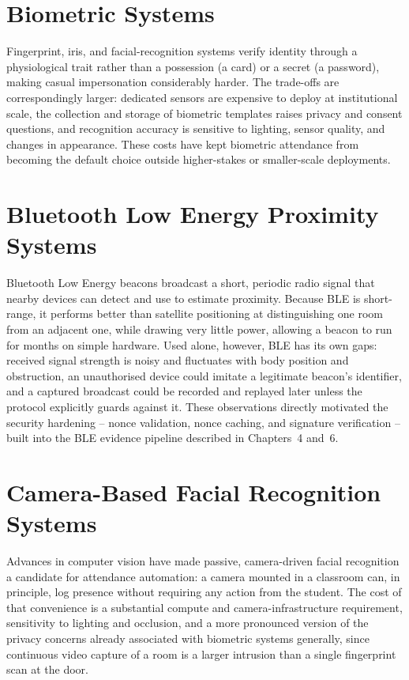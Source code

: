 \documentclass[12pt, a4paper, oneside]{report}
\begin{document}
\section{Biometric Systems}

Fingerprint, iris, and facial-recognition systems verify identity through a physiological trait rather than a possession (a card) or a secret (a password), making casual impersonation considerably harder. The trade-offs are correspondingly larger: dedicated sensors are expensive to deploy at institutional scale, the collection and storage of biometric templates raises privacy and consent questions, and recognition accuracy is sensitive to lighting, sensor quality, and changes in appearance. These costs have kept biometric attendance from becoming the default choice outside higher-stakes or smaller-scale deployments.

\section{Bluetooth Low Energy Proximity Systems}

Bluetooth Low Energy beacons broadcast a short, periodic radio signal that nearby devices can detect and use to estimate proximity. Because BLE is short-range, it performs better than satellite positioning at distinguishing one room from an adjacent one, while drawing very little power, allowing a beacon to run for months on simple hardware. Used alone, however, BLE has its own gaps: received signal strength is noisy and fluctuates with body position and obstruction, an unauthorised device could imitate a legitimate beacon's identifier, and a captured broadcast could be recorded and replayed later unless the protocol explicitly guards against it. These observations directly motivated the security hardening -- nonce validation, nonce caching, and signature verification -- built into the BLE evidence pipeline described in Chapters~4 and~6.

\section{Camera-Based Facial Recognition Systems}

Advances in computer vision have made passive, camera-driven facial recognition a candidate for attendance automation: a camera mounted in a classroom can, in principle, log presence without requiring any action from the student. The cost of that convenience is a substantial compute and camera-infrastructure requirement, sensitivity to lighting and occlusion, and a more pronounced version of the privacy concerns already associated with biometric systems generally, since continuous video capture of a room is a larger intrusion than a single fingerprint scan at the door.
\end{document}
